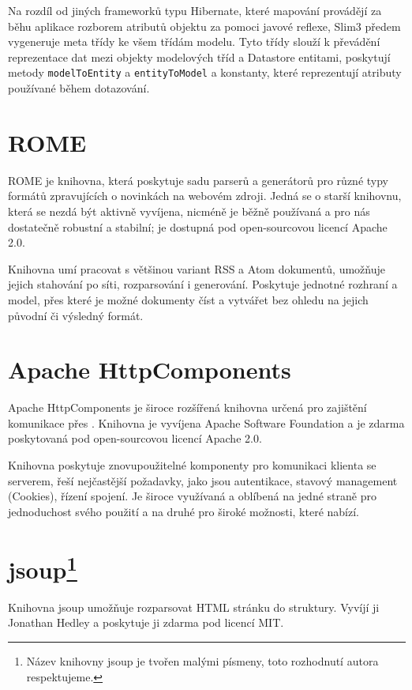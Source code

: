 Na rozdíl od jiných  frameworků typu Hibernate, které mapování provádějí za běhu aplikace rozborem atributů objektu za pomoci javové reflexe, Slim3 předem vygeneruje meta třídy ke všem třídám modelu.
Tyto třídy slouží k převádění reprezentace dat mezi objekty modelových tříd a Datastore entitami, poskytují metody \verb|modelToEntity| a \verb|entityToModel| a konstanty, které reprezentují atributy používané během dotazování.

\section{ROME}
ROME je knihovna, která poskytuje sadu parserů a generátorů pro různé typy formátů zpravujících o novinkách na webovém zdroji.
Jedná se o starší knihovnu, která se nezdá být aktivně vyvíjena, nicméně je běžně používaná a pro nás dostatečně robustní a stabilní; je dostupná pod open-sourcovou licencí Apache 2.0\cite{apache20}.

Knihovna umí pracovat s většinou variant RSS a Atom dokumentů, umožňuje jejich stahování po síti, rozparsování i generování.
Poskytuje jednotné rozhraní a model, přes které je možné dokumenty číst a vytvářet bez ohledu na jejich původní či výsledný formát.

\section{Apache HttpComponents}
Apache HttpComponents je široce rozšířená kni\-hov\-na určená pro zajištění komunikace přes .
Knihovna je vyvíjena Apache Software Foundation a je zdarma poskytovaná pod open-sourcovou licencí Apache 2.0\cite{apache20}.

Knihovna poskytuje znovupoužitelné komponenty pro komunikaci klienta se serverem, řeší nejčastější požadavky, jako jsou autentikace, stavový management (Cookies), řízení spojení.
Je široce využívaná a oblíbená na jedné straně pro jednoduchost svého použití a na druhé pro široké možnosti, které nabízí.

\section{\texorpdfstring{jsoup\footnote{Název knihovny jsoup je tvořen malými písmeny, toto rozhodnutí autora respektujeme.}}{jsoup}}
Knihovna jsoup umožňuje rozparsovat HTML stránku do  struktury.
Vyvíjí ji Jonathan Hedley a poskytuje ji zdarma pod licencí MIT.

